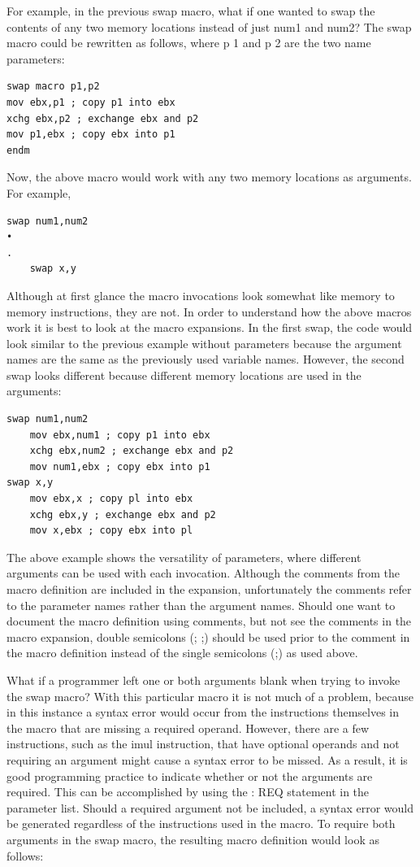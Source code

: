 \documentclass[10pt]{book}
\begin{document}
For example, in the previous swap macro, what if one wanted to swap the contents of any two memory locations instead of just num1 and num2? The swap macro could be rewritten as follows, where p 1 and p 2 are the two name parameters:

\begin{verbatim}
swap macro p1,p2
mov ebx,p1 ; copy p1 into ebx
xchg ebx,p2 ; exchange ebx and p2
mov p1,ebx ; copy ebx into p1
endm
\end{verbatim}

Now, the above macro would work with any two memory locations as arguments. For example,

\begin{verbatim}
swap num1,num2
•
.
    swap x,y
\end{verbatim}

Although at first glance the macro invocations look somewhat like memory to memory instructions, they are not. In order to understand how the above macros work it is best to look at the macro expansions. In the first swap, the code would look similar to the previous example without parameters because the argument
names are the same as the previously used variable names. However, the second swap looks different because different memory locations are used in the arguments:
\begin{verbatim}
swap num1,num2
    mov ebx,num1 ; copy p1 into ebx
    xchg ebx,num2 ; exchange ebx and p2
    mov num1,ebx ; copy ebx into p1
swap x,y
    mov ebx,x ; copy pl into ebx
    xchg ebx,y ; exchange ebx and p2
    mov x,ebx ; copy ebx into pl
\end{verbatim}

The above example shows the versatility of parameters, where different arguments can be used with each invocation. Although the comments from the macro definition are included in the expansion, unfortunately the comments refer to the parameter names rather than the argument names. Should one want to document the macro definition using comments, but not see the comments in the macro expansion, double semicolons (; ;) should be used prior to the comment in the macro definition instead of the single semicolons (;) as used above.

What if a programmer left one or both arguments blank when trying to invoke the swap macro? With this particular macro it is not much of a problem, because in this instance a syntax error would occur from the instructions themselves in the macro that are missing a required operand. However, there are a few instructions, such as the imul instruction, that have optional operands and not requiring an argument might cause a syntax error to be missed. As a result, it is good programming practice to indicate whether or not the arguments are required. This can be accomplished by using the : REQ statement in the parameter list. Should a required argument not be included, a syntax error would be generated regardless of the instructions used in the macro. To require both arguments in the swap macro, the resulting macro definition would look as follows:
\end{document}
